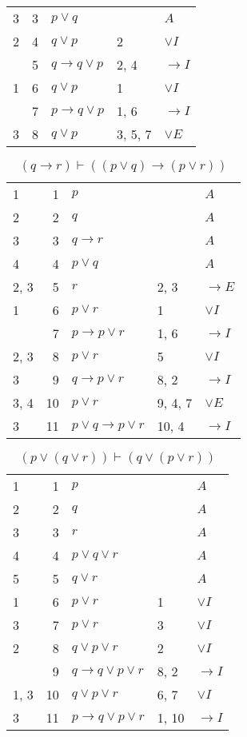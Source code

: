 \documentclass{article}
\begin{document}
\begin{table}[htbp]
\begin{tabular}{lrlll}
{3} & 3 & $p∨q$ & {} & $A$ \\
{2} & 4 & $q∨p$ & {2} & $∨I$ \\
{} & 5 & $q→q∨p$ & {2, 4} & $→I$ \\
{1} & 6 & $q∨p$ & {1} & $∨I$ \\
{} & 7 & $p→q∨p$ & {1, 6} & $→I$ \\
{3} & 8 & $q∨p$ & {3, 5, 7} & $∨E$ \\
\end{tabular}
\end{table}\begin{table}[htbp]\caption*{$(q→r) ⊢ ((p∨q)→(p∨r))$}\centering\begin{tabular}{lrlll}
{1} & 1 & $p$ & {} & $A$ \\
{2} & 2 & $q$ & {} & $A$ \\
{3} & 3 & $q→r$ & {} & $A$ \\
{4} & 4 & $p∨q$ & {} & $A$ \\
{2, 3} & 5 & $r$ & {2, 3} & $→E$ \\
{1} & 6 & $p∨r$ & {1} & $∨I$ \\
{} & 7 & $p→p∨r$ & {1, 6} & $→I$ \\
{2, 3} & 8 & $p∨r$ & {5} & $∨I$ \\
{3} & 9 & $q→p∨r$ & {8, 2} & $→I$ \\
{3, 4} & 10 & $p∨r$ & {9, 4, 7} & $∨E$ \\
{3} & 11 & $p∨q→p∨r$ & {10, 4} & $→I$ \\
\end{tabular}
\end{table}\begin{table}[htbp]\caption*{$(p∨(q∨r)) ⊢ (q∨(p∨r))$}\centering\begin{tabular}{lrlll}
{1} & 1 & $p$ & {} & $A$ \\
{2} & 2 & $q$ & {} & $A$ \\
{3} & 3 & $r$ & {} & $A$ \\
{4} & 4 & $p∨q∨r$ & {} & $A$ \\
{5} & 5 & $q∨r$ & {} & $A$ \\
{1} & 6 & $p∨r$ & {1} & $∨I$ \\
{3} & 7 & $p∨r$ & {3} & $∨I$ \\
{2} & 8 & $q∨p∨r$ & {2} & $∨I$ \\
{} & 9 & $q→q∨p∨r$ & {8, 2} & $→I$ \\
{1, 3} & 10 & $q∨p∨r$ & {6, 7} & $∨I$ \\
{3} & 11 & $p→q∨p∨r$ & {1, 10} & $→I$ \\

\end{tabular}
\end{table}
\end{document}
